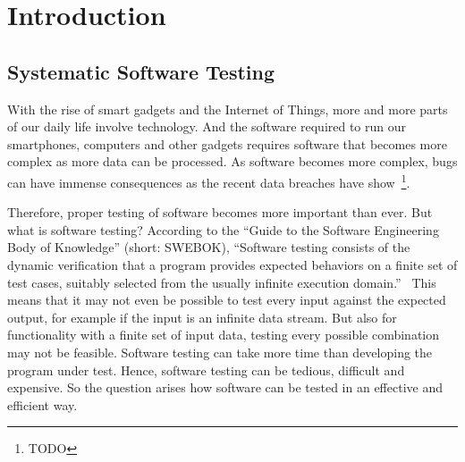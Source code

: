 \chapter{Introduction}\label{sec:introduction}


\section{Systematic Software Testing}\label{sec:introduction_software_testing}

With the rise of smart gadgets and the Internet of Things, more and more parts of our daily life involve technology.
And the software required to run our smartphones, computers and other gadgets requires software that becomes more complex as more data can be processed.
As software becomes more complex, bugs can have immense consequences as the recent data breaches have show~\footnote{TODO}.

Therefore, proper testing of software becomes more important than ever.
But what is software testing? According to the \enquote{Guide to the Software Engineering Body of Knowledge} (short: SWEBOK), \enquote{Software testing consists of the dynamic verification that a program provides expected behaviors on a finite set of test cases, suitably selected from the usually infinite execution domain.}~\cite{SWEBOK}
This means that it may not even be possible to test every input against the expected output, for example if the input is an infinite data stream.
But also for functionality with a finite set of input data, testing every possible combination may not be feasible.
Software testing can take more time than developing the program under test. Hence, software testing can be tedious, difficult and expensive.
So the question arises how software can be tested in an effective and efficient way.

